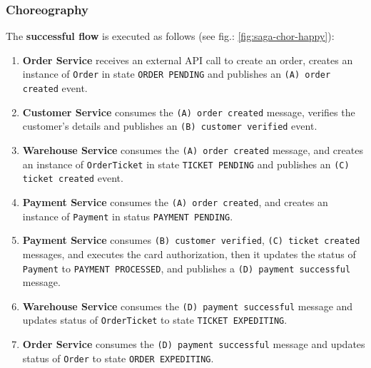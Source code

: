 \documentclass[thesis=M,english,hidelinks]{FITthesis}[2012/10/20]
\begin{document}
\subsubsection{Choreography}

The \textbf{successful flow} is executed as follows (see fig.: \ref{fig:saga-chor-happy}):
\begin{enumerate}
    \item \textbf{Order Service} receives an external \acrshort{API} call to create an order, creates an instance of \texttt{Order} in state \texttt{ORDER PENDING} and publishes an \texttt{(A) order created} event.
    \item \textbf{Customer Service} consumes the \texttt{(A) order created} message, verifies the customer's details and publishes an \texttt{(B) customer verified} event.
    \item \textbf{Warehouse Service} consumes the \texttt{(A) order created} message, and creates an instance of \texttt{OrderTicket} in state \texttt{TICKET PENDING} and publishes an \texttt{(C) ticket created} event.
    \item \textbf{Payment Service} consumes the \texttt{(A) order created}, and creates an instance of \texttt{Payment} in status \texttt{PAYMENT PENDING}.
    \item \textbf{Payment Service} consumes \texttt{(B) customer verified}, \texttt{(C) ticket created} messages, and executes the card authorization, then it updates the status of \texttt{Payment} to \texttt{PAYMENT PROCESSED}, and publishes a \texttt{(D) payment successful} message.
    \item \textbf{Warehouse Service} consumes the \texttt{(D) payment successful} message and updates status of \texttt{OrderTicket} to state \texttt{TICKET EXPEDITING}.
    \item \textbf{Order Service} consumes the \texttt{(D) payment successful} message and updates status of \texttt{Order} to state \texttt{ORDER EXPEDITING}.
\end{enumerate}
\end{document}
